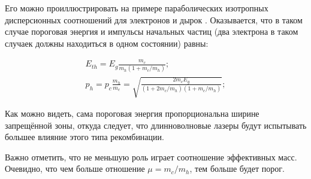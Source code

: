 \documentclass[../main.tex]{subfiles}
\begin{document}
    Его можно проиллюстрировать на примере параболических изотропных дисперсионных 
    соотношений для электронов и дырок \cite{AbakumovYassievich1997}. Оказывается,
    что в таком случае пороговая энергия и импульсы начальных частиц (два электрона
    в таком случаек должны находиться в одном состоянии) равны:

        \begin{equation}
            \begin{array}{l}
                E_{th} = E_g \frac{m_c}{m_h ( 1 + m_c / m_h)};\\
                p_{h} = p_{c} \frac{m_h}{m_c} = \sqrt{\frac{2m_c E_g}{(1+ 2m_c/m_h)(1+ m_c / m_h)}};
            \end{array}
        \end{equation}

    Как можно видеть, сама пороговая энергия пропорциональна ширине запрещённой зоны,
    откуда следует, что длинноволновые  лазеры будут испытывать большее влияние этого 
    типа рекомбинации.

    Важно отметить, что не меньшую роль играет соотношение эффективных
    масс. Очевидно, что чем больше отношение $\mu = m_c / m_h$, тем больше будет порог.
\end{document}

